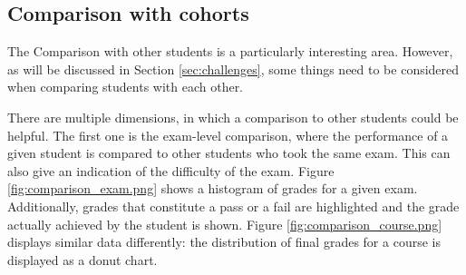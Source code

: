 \subsection{Comparison with cohorts}
\label{subsec:comparison}

The Comparison with other students is a particularly interesting area. However, as will be discussed in Section \ref{sec:challenges}, some things need to be considered when comparing students with each other.

There are multiple dimensions, in which a comparison to other students could be helpful. The first one is the exam-level comparison, where the performance of a given student is compared to other students who took the same exam. This can also give an indication of the difficulty of the exam. Figure \ref{fig:comparison_exam.png} shows a histogram of grades for a given exam. Additionally, grades that constitute a pass or a fail are highlighted and the grade actually achieved by the student is shown. Figure \ref{fig:comparison_course.png} displays similar data differently: the distribution of final grades for a course is displayed as a donut chart.

